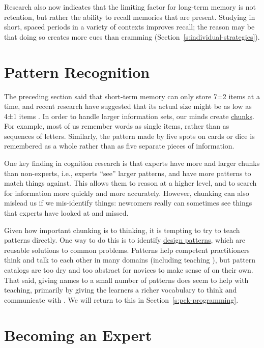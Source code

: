 Research also now indicates that the limiting factor for long-term
memory is not retention, but rather the ability to recall memories that
are present. Studying in short, spaced periods in a variety of contexts
improves recall; the reason may be that doing so creates more cues than
cramming (Section~\ref{s:individual-strategies}).

\section{Pattern Recognition}\label{s:memory-pattern}

The preceding section said that short-term memory can only store
7±2 items at a time, and recent research have suggested that its
actual size might be as low as 4±1 items \cite{Dida2016}. In
order to handle larger information sets, our minds create
\protect\hyperlink{g:chunking}{chunks}. For example, most of us remember words
as single items, rather than as sequences of letters. Similarly, the
pattern made by five spots on cards or dice is remembered as a whole
rather than as five separate pieces of information.

One key finding in cognition research is that experts have more and
larger chunks than non-experts, i.e., experts ``see'' larger patterns, and
have more patterns to match things against. This allows them to reason
at a higher level, and to search for information more quickly and more
accurately. However, chunking can also mislead us if we mis-identify
things: newcomers really can sometimes see things that experts have
looked at and missed.

Given how important chunking is to thinking, it is tempting to try to
teach patterns directly. One way to do this is to identify \href{https://en.wikipedia.org/wiki/Software_design_pattern}{design
patterns}, which are reusable solutions to common
problems. Patterns help competent practitioners think and talk to each
other in many domains (including teaching \cite{Berg2012}), but
pattern catalogs are too dry and too abstract for novices to make
sense of on their own. That said, giving names to a small number of
patterns does seem to help with teaching, primarily by giving the
learners a richer vocabulary to think and communicate with
\cite{Kuit2004,Byck2005,Saja2006}. We will
return to this in Section~\ref{s:pck-programming}.

\section{Becoming an Expert}\label{s:memory-becoming-expert}

